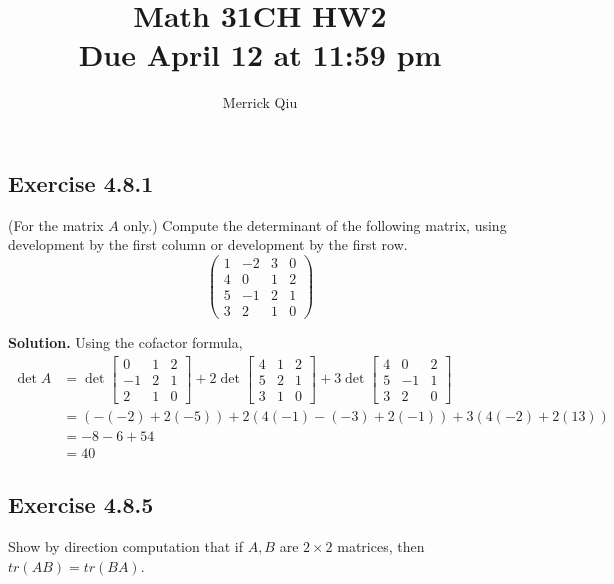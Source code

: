 \documentclass[12pt]{article}
\title{Math 31CH HW2 \\ Due April 12 at 11:59 pm}
\author{Merrick Qiu}
\date{}
\begin{document}
\maketitle
\newpage



\subsection*{Exercise 4.8.1} (For the matrix $A$ only.)
Compute the determinant of the following matrix, using development by the first column or development by the first row.
$$
\begin{pmatrix}1&-2&3&0\\
4&0&1&2\\5&-1&2&1\\
3&2&1&0\end{pmatrix}
$$

\medskip

\textbf{Solution.}
Using the cofactor formula,
\begin{align*}
    \det A
    &= \det 
        \begin{bmatrix}
            0 & 1 & 2 \\
            -1 & 2 & 1 \\
            2 & 1 & 0
        \end{bmatrix}
    + 2 \det 
        \begin{bmatrix}
            4 & 1 & 2 \\
            5 & 2 & 1 \\
            3 & 1 & 0
        \end{bmatrix}
    + 3 \det 
        \begin{bmatrix}
            4 & 0 & 2 \\
            5 & -1 & 1 \\
            3 & 2 & 0
        \end{bmatrix} \\
    &= (-(-2) + 2(-5)) + 2(4(-1)-(-3)+2(-1)) + 3(4(-2)+2(13)) \\
    &= -8 -6 +54 \\
    &= 40
\end{align*}
\newpage















\subsection*{Exercise 4.8.5}
Show by direction computation that if $A,B$ are $2\times 2$ matrices, then $tr(AB) = tr(BA)$.
\end{document}
